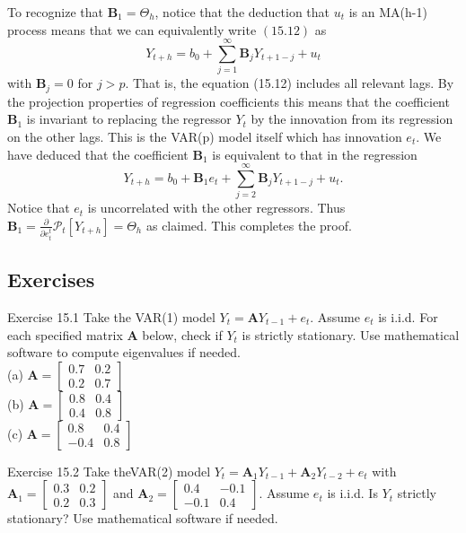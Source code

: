\documentclass[10pt]{article}
\begin{document}
To recognize that $\boldsymbol{B}_{1}=\Theta_{h}$, notice that the deduction that $u_{t}$ is an MA(h-1) process means that we can equivalently write $(15.12)$ as
$$
Y_{t+h}=b_{0}+\sum_{j=1}^{\infty} \boldsymbol{B}_{j} Y_{t+1-j}+u_{t}
$$
with $\boldsymbol{B}_{j}=0$ for $j>p$. That is, the equation (15.12) includes all relevant lags. By the projection properties of regression coefficients this means that the coefficient $\boldsymbol{B}_{1}$ is invariant to replacing the regressor $Y_{t}$ by the innovation from its regression on the other lags. This is the VAR(p) model itself which has innovation $e_{t}$. We have deduced that the coefficient $\boldsymbol{B}_{1}$ is equivalent to that in the regression
$$
Y_{t+h}=b_{0}+\boldsymbol{B}_{1} e_{t}+\sum_{j=2}^{\infty} \boldsymbol{B}_{j} Y_{t+1-j}+u_{t} .
$$
Notice that $e_{t}$ is uncorrelated with the other regressors. Thus $\boldsymbol{B}_{1}=\frac{\partial}{\partial e_{t}^{t}} \mathscr{P}_{t}\left[Y_{t+h}\right]=\Theta_{h}$ as claimed. This completes the proof.

\subsection{Exercises}
Exercise 15.1 Take the VAR(1) model $Y_{t}=\boldsymbol{A} Y_{t-1}+e_{t}$. Assume $e_{t}$ is i.i.d. For each specified matrix $\boldsymbol{A}$ below, check if $Y_{t}$ is strictly stationary. Use mathematical software to compute eigenvalues if needed.\\
(a) $\boldsymbol{A}=\left[\begin{array}{ll}0.7 & 0.2 \\ 0.2 & 0.7\end{array}\right]$\\
(b) $\boldsymbol{A}=\left[\begin{array}{ll}0.8 & 0.4 \\ 0.4 & 0.8\end{array}\right]$\\
(c) $\boldsymbol{A}=\left[\begin{array}{cc}0.8 & 0.4 \\ -0.4 & 0.8\end{array}\right]$

Exercise 15.2 Take theVAR(2) model $Y_{t}=\boldsymbol{A}_{1} Y_{t-1}+\boldsymbol{A}_{2} Y_{t-2}+e_{t}$ with $\boldsymbol{A}_{1}=\left[\begin{array}{cc}0.3 & 0.2 \\ 0.2 & 0.3\end{array}\right]$ and $\boldsymbol{A}_{2}=\left[\begin{array}{cc}0.4 & -0.1 \\ -0.1 & 0.4\end{array}\right]$. Assume $e_{t}$ is i.i.d. Is $Y_{t}$ strictly stationary? Use mathematical software if needed.
\end{document}
